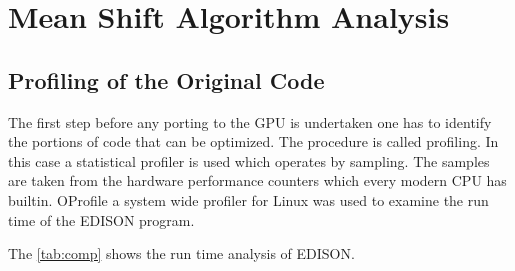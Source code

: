 \chapter{Mean Shift Algorithm Analysis} %
\label{cha:algorithm_analysis}



\section{Profiling of the Original Code} %
\label{sec:run_time_analysis_of_the_original_code}
The first step before any porting to the \gls{GPU} is undertaken one has to
identify the portions of code that can be optimized. The procedure is called
profiling. In this case a statistical profiler is used which operates by
sampling. The samples are taken from the hardware performance counters which
every modern \gls{CPU} has builtin. OProfile a system wide profiler for Linux
was used to examine the run time of the \gls{EDISON} program.

The \autoref{tab:comp} shows the run time analysis of \gls{EDISON}. 


